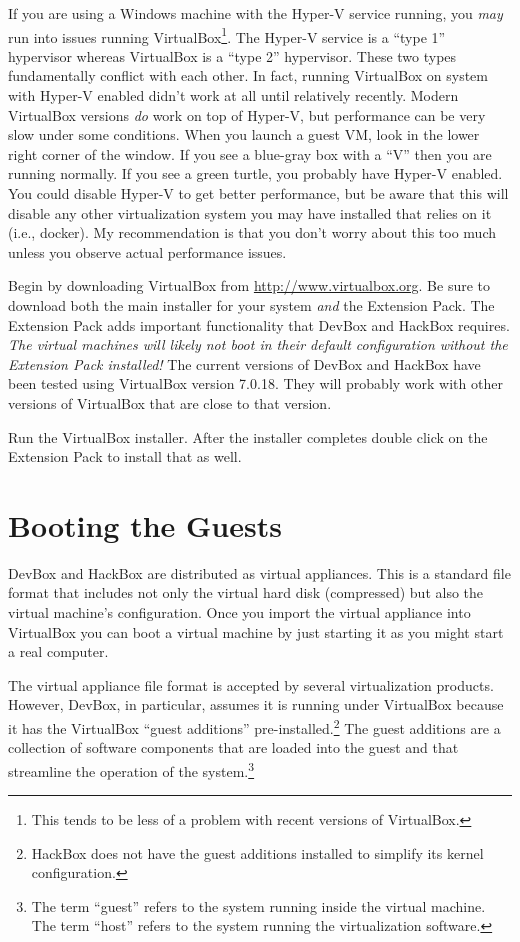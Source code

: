 \documentclass{article}
\begin{document}
If you are using a Windows machine with the Hyper-V service running, you \emph{may} run into
issues running VirtualBox\footnote{This tends to be less of a problem with recent versions of
VirtualBox.}. The Hyper-V service is a ``type 1'' hypervisor whereas VirtualBox is a ``type 2''
hypervisor. These two types fundamentally conflict with each other. In fact, running VirtualBox
on system with Hyper-V enabled didn't work at all until relatively recently. Modern VirtualBox
versions \emph{do} work on top of Hyper-V, but performance can be very slow under some
conditions. When you launch a guest VM, look in the lower right corner of the window. If you see
a blue-gray box with a ``V'' then you are running normally. If you see a green turtle, you
probably have Hyper-V enabled. You could disable Hyper-V to get better performance, but be aware
that this will disable any other virtualization system you may have installed that relies on it
(i.e., docker). My recommendation is that you don't worry about this too much unless you observe
actual performance issues.

Begin by downloading VirtualBox from \url{http://www.virtualbox.org}. Be sure to download both
the main installer for your system \emph{and} the Extension Pack. The Extension Pack adds
important functionality that DevBox and HackBox requires. \emph{The virtual machines will likely
not boot in their default configuration without the Extension Pack installed!} The current
versions of DevBox and HackBox have been tested using VirtualBox version 7.0.18. They will
probably work with other versions of VirtualBox that are close to that version.

Run the VirtualBox installer. After the installer completes double click on the Extension Pack
to install that as well.

\section{Booting the Guests}
\label{sec:booting-guests}

DevBox and HackBox are distributed as virtual appliances. This is a standard file format that
includes not only the virtual hard disk (compressed) but also the virtual machine's
configuration. Once you import the virtual appliance into VirtualBox you can boot a virtual
machine by just starting it as you might start a real computer.

The virtual appliance file format is accepted by several virtualization products. However,
DevBox, in particular, assumes it is running under VirtualBox because it has the VirtualBox
``guest additions'' pre-installed.\footnote{HackBox does not have the guest additions installed
to simplify its kernel configuration.} The guest additions are a collection of software
components that are loaded into the guest and that streamline the operation of the
system.\footnote{The term ``guest'' refers to the system running inside the virtual machine. The
term ``host'' refers to the system running the virtualization software.}
\end{document}
